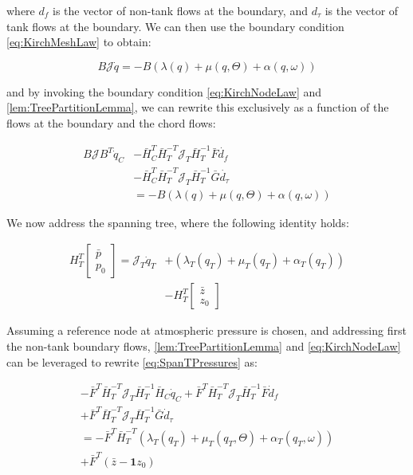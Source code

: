 where $d_f$ is the vector of non-tank flows at the boundary, and $d_\tau$ is the vector of tank flows at the boundary. We can then use the boundary condition \cref{eq:KirchMeshLaw} to obtain:

\begin{equation}\label{eq:ChordEquations}
	B\mathcal{J}\dot{q} = -B(\lambda(q) + \mu(q,\Theta) + \alpha(q,\omega))
\end{equation}

and by invoking the boundary condition \cref{eq:KirchNodeLaw} and \cref{lem:TreePartitionLemma}, we can rewrite this exclusively as a function of the flows at the boundary and the chord flows:

\begin{equation}\label{eq:ChordEquationsSimple}
	\begin{split}
	B\mathcal{J}B^T\dot{q}_C &-\bar{H}_C^T\bar{H}_T^{-T}\mathcal{J}_T\bar{H}_T^{-1} \bar{F} \dot{d_f} \\
	&-\bar{H}_C^T\bar{H}_T^{-T}\mathcal{J}_T\bar{H}_T^{-1} \bar{G} \dot{d_{\tau}} \\
	&= -B(\lambda(q) + \mu(q,\Theta) + \alpha(q,\omega))
	\end{split}
\end{equation}

We now address the spanning tree, where the following identity holds:

\begin{equation}\label{eq:SpanTPressures}
	\begin{split}
		H_T^T \begin{bmatrix} \bar{p} \\ p_0	\end{bmatrix} = 
		\mathcal{J}_T\dot{q}_T &+ (\lambda_T(q_T)+\mu_T(q_T) + \alpha_T(q_T)) \\ 
		&-H_T^T \begin{bmatrix} \bar{z} \\ z_0	\end{bmatrix}
	\end{split}
\end{equation}

Assuming a reference node at atmospheric pressure is chosen, and addressing first the non-tank boundary flows, \cref{lem:TreePartitionLemma} and \cref{eq:KirchNodeLaw} can be leveraged to rewrite \cref{eq:SpanTPressures} as:

\begin{equation}\label{eq:SpanTBoundaryFlows}
	\begin{split}
	-\bar{F}^T\bar{H}_T^{-T}\mathcal{J}_T\bar{H}_T^{-1}\bar{H}_C\dot{q}_C + \bar{F}^T\bar{H}_T^{-T}\mathcal{J}_T\bar{H}_T^{-1}\bar{F}\dot{d}_f \\ 
	+ \bar{F}^T\bar{H}_T^{-T}\mathcal{J}_T\bar{H}_T^{-1}\bar{G}\dot{d}_{\tau} \\
	= -\bar{F}^T\bar{H}_T^{-T}(\lambda_T(q_T)+\mu_T(q_T,\Theta) + \alpha_T(q_T,\omega)) \\
	+\bar{F}^T(\bar{z} - \mathbf{1}z_0)
\end{split}
\end{equation}

